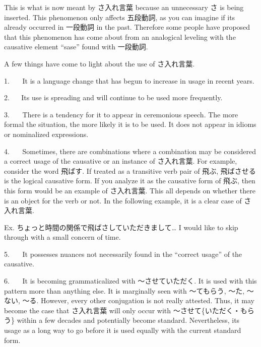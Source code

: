 \par{ This is what is now meant by さ入れ言葉 because an unnecessary さ is being inserted. This phenomenon only affects 五段動詞, as you can imagine if it\textquotesingle s already occurred in 一段動詞 in the past. Therefore some people have proposed that this phenomenon has come about from an analogical leveling with the causative element “sase” found with 一段動詞. }

\par{ A few things have come to light about the use of さ入れ言葉. }

\par{1.    It is a language change that has begun to increase in usage in recent years. }

\par{2.    Its use is spreading and will continue to be used more frequently. }

\par{3.    There is a tendency for it to appear in ceremonious speech. The more formal the situation, the more likely it is to be used. It does not appear in idioms or nominalized expressions. }

\par{4.    Sometimes, there are combinations where a combination may be considered a correct usage of the causative or an instance of さ入れ言葉. For example, consider the word 飛ばす. If treated as a transitive verb pair of 飛ぶ, 飛ばさせる is the logical causative form. If you analyze it as the causative form of 飛ぶ, then this form would be an example of さ入れ言葉. This all depends on whether there is an object for the verb or not. In the following example, it is a clear case of さ入れ言葉. }

\par{Ex. ちょっと時間の関係で飛ばさしていただきまして… \hfill\break
I would like to skip through with a small concern of time. }

\par{5.    It possesses nuances not necessarily found in the “correct usage” of the causative. }

\par{6.    It is becoming grammaticalized with ～させていただく. It is used with this pattern more than anything else. It is marginally seen with ～てもらう, ～た, ～ない, ～る. However, every other conjugation is not really attested. Thus, it may become the case that さ入れ言葉 will only occur with ～させて\{いただく・もらう\} within a few decades and potentially become standard. Nevertheless, its usage as a long way to go before it is used equally with the current standard form. }


